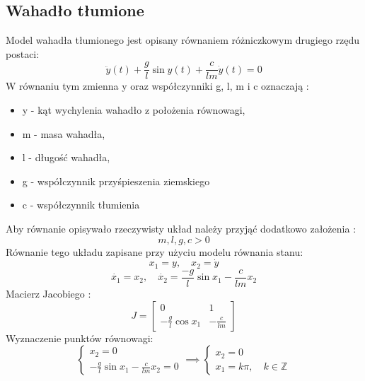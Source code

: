 \documentclass[a4paper,11pt]{article}
\begin{document}
\subsection{Wahadło tłumione}
Model wahadła tłumionego jest opisany równaniem różniczkowym drugiego rzędu postaci: 
\begin{equation*}
\ddot{y}(t)+\frac{g}{l}\sin y(t)+\frac{c}{lm}\dot{y}(t)=0
\end{equation*}
W równaniu tym zmienna y oraz współczynniki g, l, m i c oznaczają :
\begin{itemize}
\item y - kąt wychylenia wahadło z położenia równowagi, 
\item m - masa wahadła,
\item l - długość wahadła,
\item g - współczynnik przyśpieszenia ziemskiego
\item c - współczynnik tłumienia
\end{itemize} 
Aby równanie opisywało rzeczywisty układ należy przyjąć dodatkowo założenia : \\ 
\begin{equation*}
m, l, g, c  > 0
\end{equation*}
Równanie tego układu zapisane przy użyciu modelu równania stanu: \\
\begin{equation*}
x_{1}=y, \quad x_{2}=\dot{y}
\end{equation*}
\begin{equation*}
\dot{x_{1}}=x_{2}, \quad \dot{x_{2}}=\frac{-g}{l}\sin x_{1}-\frac{c}{lm}x_{2}
\end{equation*}
Macierz Jacobiego : 
\begin{equation*}
J=\begin{bmatrix}
0 & 1 \\
-\frac{g}{l}\cos x_{1} & -\frac{c}{lm} 
\end{bmatrix}
\end{equation*}
Wyznaczenie punktów równowagi: \\
\begin{equation*}
\begin{cases}
x_{2}=0 \\
-\frac{g}{l}\sin x_{1}-\frac{c}{lm}x_{2}=0
\end{cases} \implies
\begin{cases}
x_{2}=0 \\
x_{1}=k\pi, \quad k\in\mathbb{Z}
\end{cases}
\end{equation*}
\end{document}
